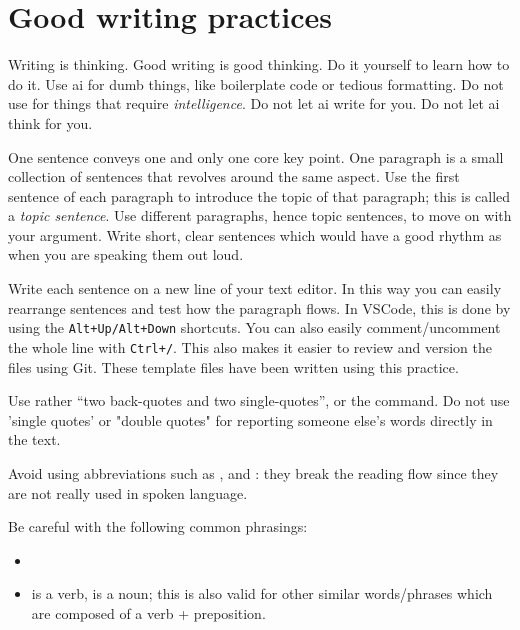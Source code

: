 \section{Good writing practices}

Writing is thinking.
Good writing is good thinking.
Do it yourself to learn how to do it.
Use \gls{ai} for dumb things, like boilerplate code or tedious formatting.
Do not use  for things that require \emph{intelligence}.
Do not let \gls{ai} write for you.
Do not let \gls{ai} think for you.


One sentence conveys one and only one core key point. 
One paragraph is a small collection of sentences that revolves around the same aspect.
Use the first sentence of each paragraph to introduce the topic of that paragraph; this is called a \emph{topic sentence}. 
Use different paragraphs, hence topic sentences, to move on with your argument.
Write short, clear sentences which would have a good rhythm as when you are speaking them out loud.


Write each sentence on a new line of your text editor. 
In this way you can easily rearrange sentences and test how the paragraph flows. 
In VSCode, this is done by using the \texttt{Alt+Up/Alt+Down} shortcuts. 
You can also easily comment/uncomment the whole line with \texttt{Ctrl+/}.
This also makes it easier to review and version the files using Git.
These template files have been written using this practice.


Use rather ``two back-quotes and two single-quotes'', or the  command.
Do not use 'single quotes' or "double quotes" for reporting someone else's words directly in the text.


Avoid using abbreviations such as \ie, \eg and \wrt: they break the reading flow since they are not really used in spoken language.


Be careful with the following common phrasings:
\begin{itemize}
    \item {} \textrightarrow{} 
    \item {} is a verb,  is a noun; this is also valid for other similar words/phrases which are composed of a verb + preposition.
\end{itemize}



